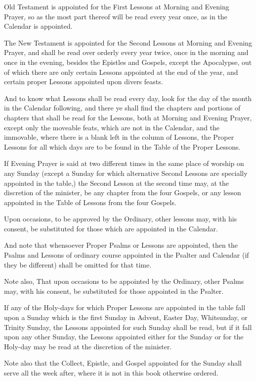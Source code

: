 
 Old Testament is appointed for the First Lessons at Morning and Evening Prayer, so as the most part thereof will be read every year once, as in the Calendar is appointed.

The New Testament is appointed for the Second Lessons at Morning and Evening Prayer, and shall be read over orderly every year twice, once in the morning and once in the evening, besides the Epistles and Gospels, except the Apocalypse, out of which there are only certain Lessons appointed at the end of the year, and certain proper Lessons appointed upon divers feasts.

And to know what Lessons shall be read every day, look for the day of the month in the Calendar following, and there ye shall find the chapters and portions of chapters that shall be read for the Lessons, both at Morning and Evening Prayer, except only the moveable feats, which are not in the Calendar, and the immovable, where there is a blank left in the column of Lessons, the Proper Lessons for all which days are to be found in the Table of the Proper Lessons.

If Evening Prayer is said at two different times in the same place of worship on any Sunday (except a Sunday for which alternative Second Lessons are specially appointed in the table,) the Second Lesson at the second time may, at the discretion of the minister, be any chapter from the four Gospels, or any lesson appointed in the Table of Lessons from the four Gospels.

Upon occasions, to be approved by the Ordinary, other lessons may, with his consent, be substituted for those which are appointed in the Calendar.

And note that whensoever Proper Psalms or Lessons are appointed, then the Psalms and Lessons of ordinary course appointed in the Psalter and Calendar (if they be different) shall be omitted for that time.

Note also, That upon occasions to be appointed by the Ordinary, other Psalms may, with his consent, be substituted for those appointed in the Psalter.

If any of the Holy-days for which Proper Lessons are appointed in the table fall upon a Sunday which is the first Sunday in Advent, Easter Day, Whitsunday, or Trinity Sunday, the Lessons appointed for such Sunday shall be read, but if it fall upon any other Sunday, the Lessons appointed either for the Sunday or for the Holy-day may be read at the discretion of the minister.

Note also that the Collect, Epistle, and Gospel appointed for the Sunday shall serve all the week after, where it is not in this book otherwise ordered.

\clearpage
